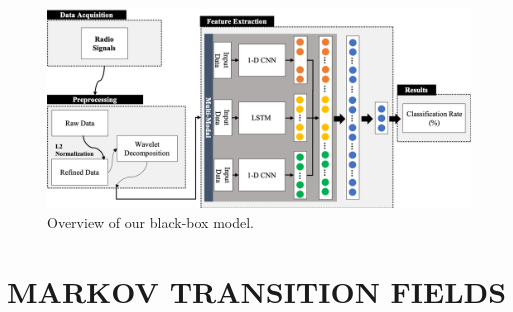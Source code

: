 \documentclass{turabian-thesis}[12pt]
\begin{document}
\begin{figure}[h!]
   \begin{center}
      \includegraphics[scale=0.65]{../media/multimodal_overview.png}
   \end{center}
   \caption{Overview of our black-box model.}
   \label{fig:multimodal_overview}
\end{figure}






 
\chapter{MARKOV TRANSITION FIELDS}
\label{chap:mtf}

\end{document}
